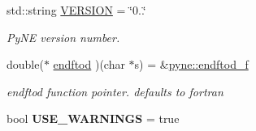\begin{DoxyCompactItemize}
std\+::string \hyperlink{namespacepyne_a462bdf434637e275c203175076b85c36}{V\+E\+R\+S\+I\+ON} = \char`\"{}0..\char`\"{}
\begin{DoxyCompactList}\small\item\em Py\+NE version number. \end{DoxyCompactList}\item 
\mbox{\label{namespacepyne_aa938a7defc049d691fa6d84aa2c1931e}} 
double($\ast$ \hyperlink{namespacepyne_aa938a7defc049d691fa6d84aa2c1931e}{endftod} )(char $\ast$s) = \&\hyperlink{namespacepyne_a14e300f1e589b42aaa451bc3cf4c70b8}{pyne\+::endftod\+\_\+f}
\begin{DoxyCompactList}\small\item\em endftod function pointer. defaults to fortran \end{DoxyCompactList}\item 
\mbox{\label{namespacepyne_aaaed56f58559ef169cab906fac4946f8}} 
bool {\bfseries U\+S\+E\+\_\+\+W\+A\+R\+N\+I\+N\+GS} = true
\end{DoxyCompactItemize}
